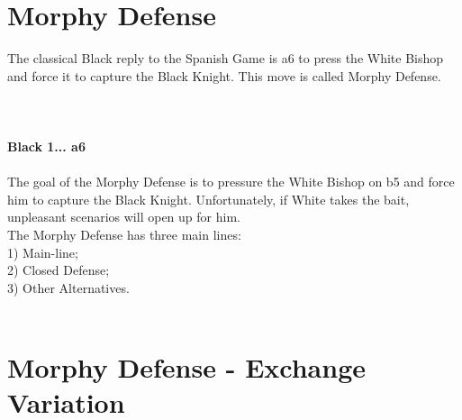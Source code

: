 \documentclass{article}
\begin{document}
\section{ Morphy Defense}

The classical Black reply to the Spanish Game is a6 to press the White Bishop and force it to capture the Black Knight. This move is called Morphy Defense.\\
\\

\\
\\
\textbf{Black 1... a6}\\
\\
The goal of the Morphy Defense is to pressure the White Bishop on b5 and force him to capture the Black Knight. Unfortunately, if White takes the bait, unpleasant scenarios will open up for him.\\The Morphy Defense has three main lines:\\1) Main-line;\\2) Closed Defense;\\3) Other Alternatives.\\
\\
\section{ Morphy Defense - Exchange Variation}
\end{document}
